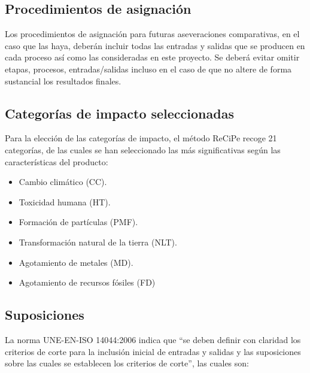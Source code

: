 \subsection{Procedimientos de asignación}
Los procedimientos de asignación para futuras aseveraciones comparativas, en el caso que las haya, deberán incluir todas las entradas y salidas que se producen en cada proceso así como las consideradas en este proyecto. Se deberá evitar omitir etapas, procesos, entradas/salidas incluso en el caso de que no altere de forma sustancial los resultados finales.

\subsection{Categorías de impacto seleccionadas}\label{sec:categoriasimpactoseleccionadas}

Para la elección de las categorías de impacto, el método ReCiPe recoge 21 categorías, de las cuales se han seleccionado las más significativas según las características del producto:

\begin{itemize}
  \item Cambio climático (CC).
  \item Toxicidad humana (HT).
  \item Formación de partículas (PMF).
  \item Transformación natural de la tierra (NLT).
  \item Agotamiento de metales (MD).
  \item Agotamiento de recursos fósiles (FD)
\end{itemize}

\subsection{Suposiciones}
La norma UNE-EN-ISO 14044:2006 \cite{iso14044} indica que ``se deben definir con claridad los criterios de corte para la inclusión inicial de entradas y salidas y las suposiciones sobre las cuales se establecen los criterios de corte'', las cuales son:

